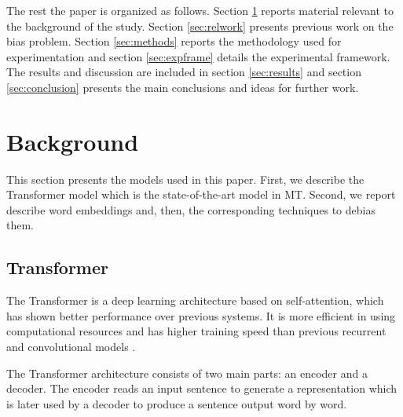 \documentclass[11pt,a4paper]{article}
\begin{document}


The rest the paper is organized as follows. Section \ref{sec:background} reports material relevant to the background of the study. Section \ref{sec:relwork} presents previous work on the bias problem. Section \ref{sec:methods} reports the methodology used for experimentation and section \ref{sec:expframe} details the experimental framework. The results and discussion are included in section \ref{sec:results} and section \ref{sec:conclusion} presents the main conclusions and ideas for further work.



\section{Background}
\label{sec:background}

This section presents the models used in this paper. First, we describe the Transformer model which is the state-of-the-art model in MT. Second, we report describe word embeddings and, then, the corresponding techniques to debias them. 

\subsection{Transformer}


The Transformer \cite{vaswani2017} is a deep learning architecture based on self-attention, which has shown better performance over previous systems. It is more efficient in using computational resources and has higher training speed than previous recurrent \cite{sutskever2014,DBLP:journals/corr/BahdanauCB14} and convolutional models \cite{DBLP:journals/corr/GehringAGYD17}. %



The Transformer architecture consists of two main parts: an encoder and a decoder. The encoder reads an input sentence to generate a representation which is later used by a decoder to produce a sentence output word by word.
\end{document}

